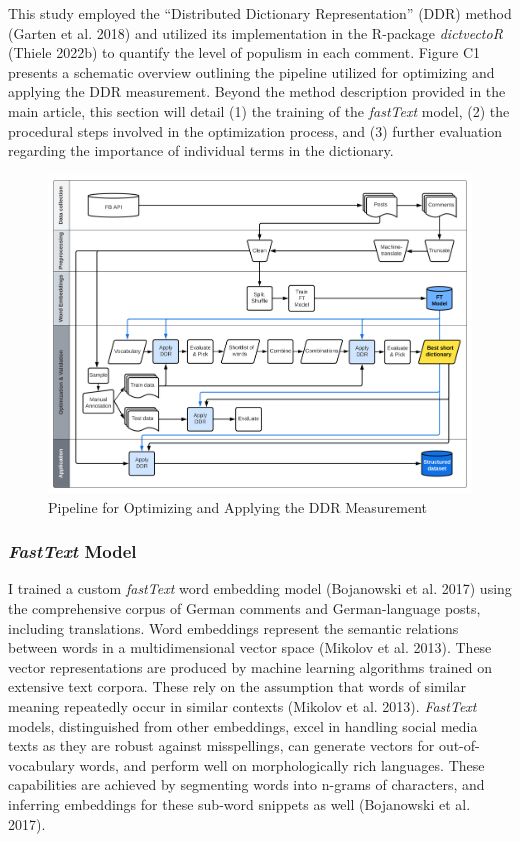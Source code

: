 \documentclass[
]{ccr}
\begin{document}
This study employed the ``Distributed Dictionary Representation'' (DDR)
method (Garten et al. 2018) and utilized its implementation in the
R-package \emph{dictvectoR} (Thiele 2022b) to quantify the level of
populism in each comment. Figure C1 presents a schematic overview
outlining the pipeline utilized for optimizing and applying the DDR
measurement. Beyond the method description provided in the main article,
this section will detail (1) the training of the \emph{fastText} model,
(2) the procedural steps involved in the optimization process, and (3)
further evaluation regarding the importance of individual terms in the
dictionary.

\begin{figure}

{\centering \includegraphics{plots/pipeline_CCR_paper_20230516.pdf}

}

\caption{Pipeline for Optimizing and Applying the DDR Measurement}

\end{figure}

\hypertarget{fasttext-model}{%
\subsubsection{\texorpdfstring{\emph{FastText}
Model}{FastText Model}}\label{fasttext-model}}

I trained a custom \emph{fastText} word embedding model (Bojanowski et
al. 2017) using the comprehensive corpus of German comments and
German-language posts, including translations. Word embeddings represent
the semantic relations between words in a multidimensional vector space
(Mikolov et al. 2013). These vector representations are produced by
machine learning algorithms trained on extensive text corpora. These
rely on the assumption that words of similar meaning repeatedly occur in
similar contexts (Mikolov et al. 2013). \emph{FastText} models,
distinguished from other embeddings, excel in handling social media
texts as they are robust against misspellings, can generate vectors for
out-of-vocabulary words, and perform well on morphologically rich
languages. These capabilities are achieved by segmenting words into
n-grams of characters, and inferring embeddings for these sub-word
snippets as well (Bojanowski et al. 2017).
\end{document}
